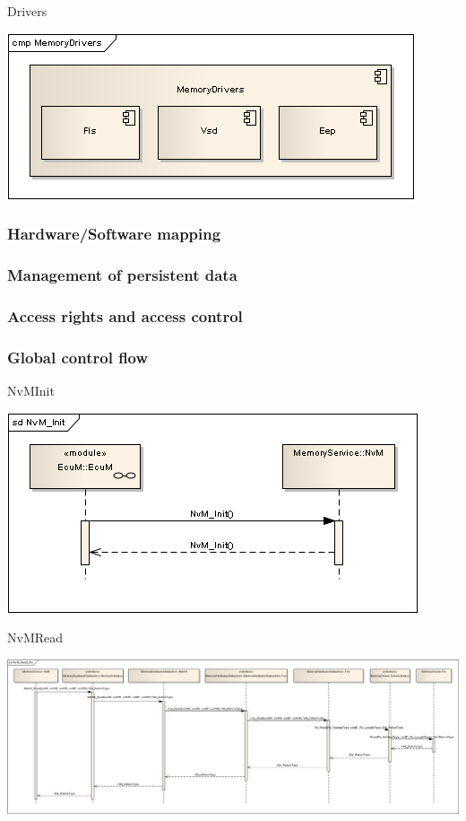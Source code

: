 Drivers
\begin{center}
\includegraphics[scale=0.7]{Images/MemoryDrivers_Overview_UML.png}
\end{center}
\subsubsection{Hardware/Software mapping}
\subsubsection{Management of persistent data}
\subsubsection{Access rights and access control}
\subsubsection{Global control flow}
NvMInit
\begin{center}
\includegraphics[scale=0.7]{Images/NvM_Init_DynamicBehavior_Overview.png}
\end{center}

NvMRead
\begin{center}
\includegraphics[scale=0.2]{Images/NvM_Read_Fls_DynamicBehavior_Overview.png}
\end{center}

